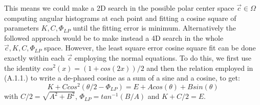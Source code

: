 \documentclass[11pt, a4paper, twoside]{article} %
\begin{document}
This means we could make a 2D search in the possible polar center space $\vec{c}\in\Omega$ computing angular histograms at each point and fitting a cosine square of parameters $K,C,\Phi_{LP}$ until the fitting error is minimum. Alternatively the followed approach would be to make instead a 4D search in the whole $\vec{c},K,C,\Phi_{LP}$ space. However, the least square error cosine square fit can be done exactly within each $\vec{c}$ employing the normal equations. To do this, we first use the identity $cos^2(x)=(1+cos(2x))/2$ and then the relation employed in (A.1.1.) to write a de-phased cosine as a sum of a sine and a cosine, to get:
\begin{equation}
K+Ccos^2(\theta/2-\Phi_{LP})=E+Acos(\theta)+Bsin(\theta)
\end{equation}
with $C/2=\sqrt{A^2+B^2}$,  $\Phi_{LP}=tan^{-1}(B/A)$ and $K+C/2=E$. 
\end{document}
